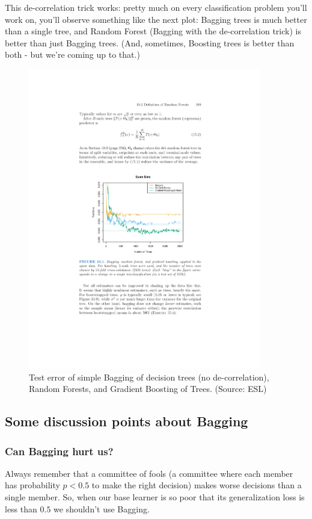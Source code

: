 \noindent
This de-correlation trick works: pretty much on every classification problem
you'll work on, you'll observe something like the next plot: Bagging trees is
much better than a single tree, and Random Forest (Bagging with the
de-correlation trick) is better than just Bagging trees. (And, sometimes,
Boosting trees is better than both - but we're coming up to that.)


\begin{figure}[H]
  \centering
  \includegraphics[width=4in]{bagging_vs_rf.pdf}
  \caption{Test error of simple Bagging of decision trees (no de-correlation),
  Random Forests, and Gradient Boosting of Trees. (Source: ESL)}
\end{figure}

\subsection{Some discussion points about Bagging}

\subsubsection*{Can Bagging hurt us?}

Always remember that a committee of fools (a committee where each member has
probability $p<0.5$ to make the right decision) makes worse decisions than a
single member. So, when our base learner is so poor that its generalization loss
is less
than $0.5$ we shouldn't use Bagging.


